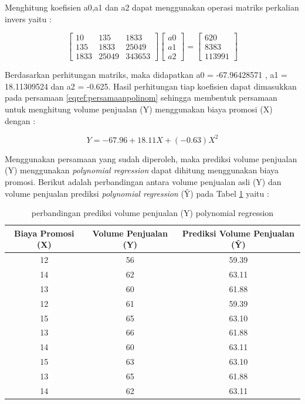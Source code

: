 \documentclass[a4paper,twoside]{article}
\begin{document}
\begin{enumerate}
Menghitung koefisien a0,a1 dan a2 dapat menggunakan operasi matriks perkalian invers yaitu : 

\begin{displaymath}
			\begin{bmatrix}
			10 & 135 & 1833 \\
			135  & 1833 & 25049 \\
			1833 & 25049 & 343653 
			\end{bmatrix}
			\begin{bmatrix}
			a0 \\ 
			a1 \\ 
			a2
			\end{bmatrix}
			=
			\begin{bmatrix}
				 620\\
				8383 \\
				 113991
			\end{bmatrix}
\end{displaymath}

Berdasarkan perhitungan matriks, maka didapatkan a0 = -67.96428571 , a1 = 18.11309524  dan a2 = -0.625. Hasil perhitungan tiap koefisien dapat dimasukkan pada persamaan \ref{eqref:persamaanpolinom} sehingga membentuk persamaan untuk menghitung volume penjualan (Y) menggunakan biaya promosi (X) dengan :


\begin{displaymath}
 Y = -67.96 + 18.11X + (-0.63)X^2 
\end{displaymath}


Menggunakan persamaan yang sudah diperoleh, maka prediksi volume penjualan (Y) menggunakan \textit{polynomial regression} dapat dihitung menggunakan biaya promosi. Berikut adalah  perbandingan antara volume penjualan asli (Y) dan volume penjualan prediksi \textit{polynomial regression} (\^{Y}) pada Tabel \ref{tab:perbandinganpolynomialregression} yaitu :

\begin{table}[ht]
\centering
\begin{tabular}{|c|c|c|}
\hline 
Biaya Promosi (X) & Volume Penjualan (Y) & Prediksi Volume Penjualan (\^{Y})  \\ 
\hline 
12 & 56 & 59.39 \\ 
\hline 
14 & 62 & 63.11 \\ 
\hline 
13 & 60 & 61.88 \\ 
\hline 
12 & 61 & 59.39 \\ 
\hline 
15 & 65 & 63.10 \\ 
\hline 
13 & 66 & 61.88 \\ 
\hline 
14 & 60 & 63.11 \\ 
\hline 
15 & 63 & 63.10 \\ 
\hline 
13 & 65 & 61.88 \\ 
\hline 
14 & 62 & 63.11 \\ 
\hline 
\end{tabular} 
\caption{perbandingan prediksi volume penjualan (Y) polynomial regression}
\label{tab:perbandinganpolynomialregression}
\end{table}



\end{enumerate}
\end{document}
